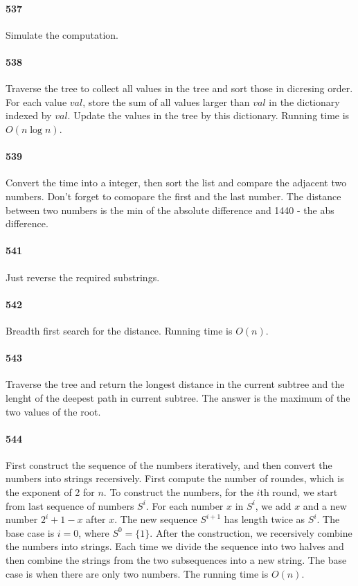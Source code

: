 \documentclass[11pt]{article}
\begin{document}
\paragraph{537}
Simulate the computation.

\paragraph{538}
Traverse the tree to collect all values in the tree and sort those in dicresing order. For each value $val$, store the sum of 
all values larger than $val$ in the dictionary indexed by $val$. Update the values in the tree by this dictionary.
Running time is $O(n \log n)$.

\paragraph{539}
Convert the time into a integer, then sort the list and compare the adjacent two numbers. Don't forget to comopare the first
and the last number. The distance between two numbers is the min of the absolute difference and 1440 - the abs difference.

\paragraph{541}
Just reverse the required substrings.

\paragraph{542}
Breadth first search for the distance. Running time is $O(n)$.

\paragraph{543}
Traverse the tree and return the longest distance in the current subtree and the lenght of the deepest path in current subtree. The answer is the maximum of the two values of the root.

\paragraph{544}
First construct the sequence of the numbers iteratively, and then convert the numbers into strings recersively.
First compute the number of roundes, which is the exponent of 2 for $n$. To construct the numbers, for the $i$th round, we start from last sequence of numbers $S^i$. For each number $x$ in $S^i$, we add $x$ and a new number $2^i+1 - x$ after $x$.
The new sequence $S^{i+1}$ has length twice as $S^i$. The base case is $i = 0$, where $S^0 = \{ 1 \}$.
After the construction, we recersively combine the numbers into strings. Each time we divide the sequence into two halves 
and then combine the strings from the two subsequences into a new string. The base case is when there are only two numbers.
The running time is $O(n)$.
\end{document}
